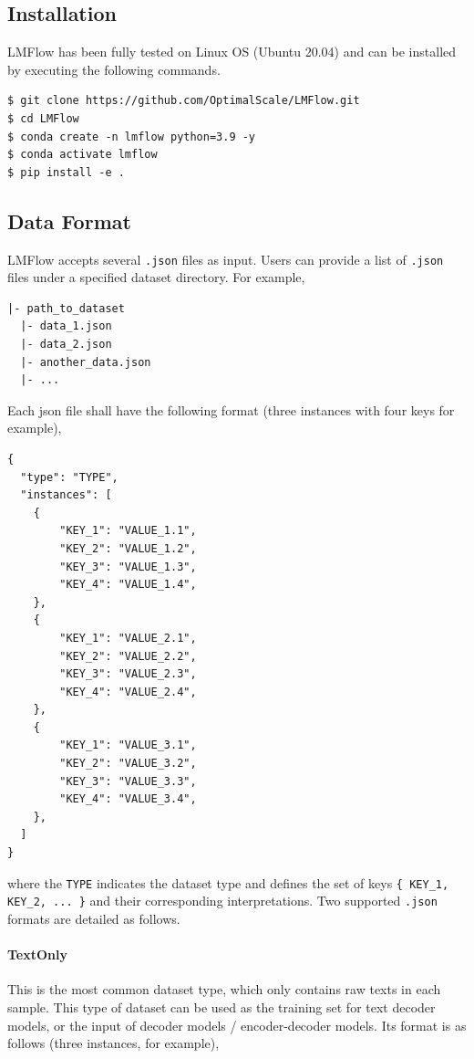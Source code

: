 \documentclass[11pt]{article}
\begin{document}
\subsection{Installation}
LMFlow has been fully tested on Linux OS (Ubuntu 20.04) and can be installed by executing the following commands.
\begin{lstlisting}[language=iPython]
$ git clone https://github.com/OptimalScale/LMFlow.git
$ cd LMFlow
$ conda create -n lmflow python=3.9 -y
$ conda activate lmflow
$ pip install -e .
\end{lstlisting}

\subsection{Data Format}
LMFlow accepts several \texttt{.json} files as input.
Users can provide a list of \texttt{.json} files under a specified dataset directory. 
For example,
\begin{lstlisting}[style = python]
|- path_to_dataset
  |- data_1.json
  |- data_2.json
  |- another_data.json
  |- ...
\end{lstlisting}
Each json file shall have the following format (three instances with four keys for example),
\begin{lstlisting}[style = python]
{
  "type": "TYPE",
  "instances": [
    {
        "KEY_1": "VALUE_1.1",
        "KEY_2": "VALUE_1.2",
        "KEY_3": "VALUE_1.3",
        "KEY_4": "VALUE_1.4",
    },
    {
        "KEY_1": "VALUE_2.1",
        "KEY_2": "VALUE_2.2",
        "KEY_3": "VALUE_2.3",
        "KEY_4": "VALUE_2.4",
    },
    {
        "KEY_1": "VALUE_3.1",
        "KEY_2": "VALUE_3.2",
        "KEY_3": "VALUE_3.3",
        "KEY_4": "VALUE_3.4",
    },
  ]
}
\end{lstlisting}

where the \texttt{TYPE} indicates the dataset type and defines the set of keys \texttt{\{ KEY\_1, KEY\_2, ... \}} and their corresponding interpretations. 
Two supported \texttt{.json} formats are detailed as follows.

\paragraph{TextOnly}
This is the most common dataset type, which only contains raw texts in each sample. This type of dataset can be used as the training set for text decoder models, or the input of decoder models / encoder-decoder models. Its format is as follows (three instances, for example),
\end{document}

